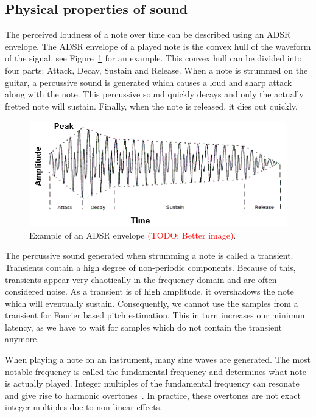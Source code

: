 \documentclass[10pt,twocolumn]{article}
\begin{document}
\subsection{Physical properties of sound}  \label{sec:physsound}
The perceived loudness of a note over time can be described using an ADSR envelope. The ADSR envelope of a played note is the convex hull of the waveform of the signal, see Figure~\ref{fig:adsr} for an example. This convex hull can be divided into four parts: Attack, Decay, Sustain and Release. When a note is strummed on the guitar, a percussive sound is generated which causes a loud and sharp attack along with the note. This percussive sound quickly decays and only the actually fretted note will sustain. Finally, when the note is released, it dies out quickly.
\begin{figure}[h]
    \centering
    \includegraphics[width=\linewidth]{fig/envelope.png}
    \caption{Example of an ADSR envelope \textcolor{red}{(TODO: Better image)}.}
    \label{fig:adsr}
\end{figure}

The percussive sound generated when strumming a note is called a transient. Transients contain a high degree of non-periodic components. Because of this, transients appear very chaotically in the frequency domain and are often considered noise. As a transient is of high amplitude, it overshadows the note which will eventually sustain. Consequently, we cannot use the samples from a transient for Fourier based pitch estimation. This in turn increases our minimum latency, as we have to wait for samples which do not contain the transient anymore.

When playing a note on an instrument, many sine waves are generated. The most notable frequency is called the fundamental frequency and determines what note is actually played. Integer multiples of the fundamental frequency can resonate and give rise to harmonic overtones~\cite{overtones}. In practice, these overtones are not exact integer multiples due to non-linear effects.
\end{document}
